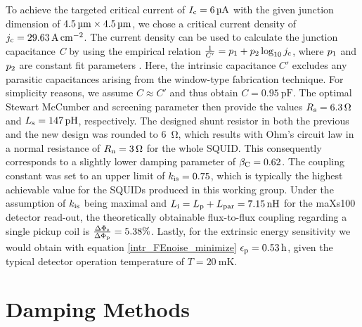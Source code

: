
To achieve the targeted critical current of $I_{\rm c}=\qty{6}{\micro\ampere}$ with the given junction dimension of $\qtyproduct{4.5 x 4.5}{\micro\meter}$, we chose a critical current density of $j_{\rm c}=\qty{29.63}{\ampere\per\cm\squared}$. The current density can be used to calculate the junction capacitance \textit{C} by using the empirical relation $\frac{1}{C'}=p_1 + p_2\log_{10}j_{\rm c}$, where $p_{\rm 1}$ and $p_{\rm 2}$ are constant fit parameters \cite{Maezawa1995}. Here, the intrinsic capacitance $C'$ excludes any parasitic capacitances arising from the window-type fabrication technique. For simplicity reasons, we assume $C\approx C'$ and thus obtain $C=\qty{0.95}{\pico\farad}$. The optimal Stewart McCumber and screening parameter then provide the values $R_{\rm s}=\qty{6.3}{\ohm}$ and $L_{\rm s}=\qty{147}{\pico\henry}$, respectively. The designed shunt resistor in both the previous and the new design was rounded to \qty{6}{\ohm}, which results with Ohm's circuit law in a normal resistance of $R_{\rm n}=\qty{3}{\ohm}$ for the whole SQUID. This consequently corresponds to a slightly lower damping parameter of $\beta_{\rm C}=0.62$. The coupling constant was set to an upper limit of $k_{\rm is}=0.75$, which is typically the highest achievable value for the SQUIDs produced in this working group. Under the assumption of $k_{\rm is}$ being maximal and $L_{\rm i}=L_{\rm p}+L_{\rm par}=\qty{7.15}{\nano\henry}$ for the maXs100 detector read-out, the theoretically obtainable flux-to-flux coupling regarding a single pickup coil is $\frac{\Delta\Phi_{\rm s}}{\Delta\Phi_{\rm p}}=5.38\%$. Lastly, for the extrinsic energy sensitivity we would obtain with equation \ref{intr_FEnoise_minimize} $\epsilon_{\rm p}=\qty{0.53}{h}$, given the typical detector operation temperature of $T=\qty{20}{\milli\kelvin}$.   

\section{Damping Methods} \label{sec_damping}

